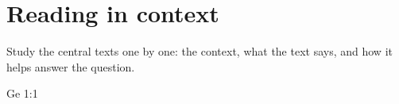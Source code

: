 \chapter{Reading in context}

\begin{objetivo}
Study the central texts one by one: the context, what the text says, and how
it helps answer the question.
\end{objetivo}

\begin{fichatexto}{Ge 1:1}
\end{fichatexto}

